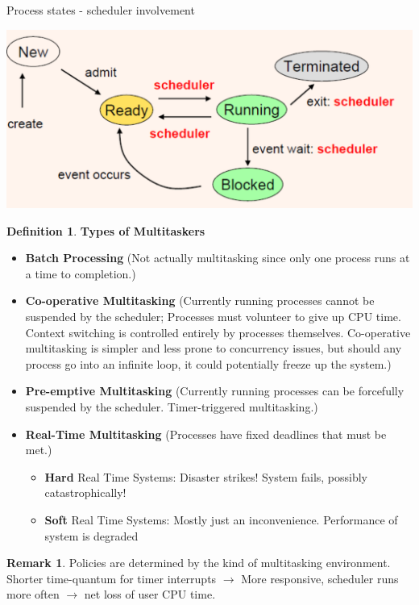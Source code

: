 \documentclass[12pt,a4paper]{article}
\theoremstyle{definition}
\newtheorem*{remark}{Remark}
\newtheorem{definition}{Definition}[section]
\newenvironment{myitemize}
{ \begin{itemize}
    \setlength{\itemsep}{5pt}
    \setlength{\parskip}{0pt}
    \setlength{\parsep}{0pt}     }
{ \end{itemize}                  }
\begin{document}
\begin{tcolorbox}
	\textsf{Process states - scheduler involvement}
	
	\includegraphics[scale=0.4]{m1/processSchedulerStates}
	\centering
\end{tcolorbox}

\begin{definition}{\textbf{Types of Multitaskers}}
	\begin{myitemize}
		\item \textbf{Batch Processing} (Not actually multitasking since only one process runs at a time to completion.)
		\item \textbf{Co-operative Multitasking} (Currently running processes cannot be suspended by the scheduler; Processes must volunteer to give up CPU time. Context switching is controlled entirely by processes themselves. Co-operative multitasking is simpler and less prone to concurrency issues, but should any process go into an infinite loop, it could potentially freeze up the system.)
		\item \textbf{Pre-emptive Multitasking} (Currently running processes can be forcefully suspended by the scheduler. \textsf{Timer-triggered} multitasking.)
		\item \textbf{Real-Time Multitasking} (Processes have fixed deadlines that must be met.)
		\begin{myitemize}
			\item \textbf{Hard} Real Time Systems: Disaster strikes! System fails, possibly catastrophically!
			\item \textbf{Soft} Real Time Systems: Mostly just an inconvenience. Performance of system is degraded
		\end{myitemize}
	\end{myitemize}
\end{definition}
\begin{remark}
	Policies are determined by the kind of multitasking environment. Shorter time-quantum for timer interrupts $\rightarrow$ More responsive, scheduler runs more often $\rightarrow$ net loss of user CPU time.
\end{remark}
\end{document}
